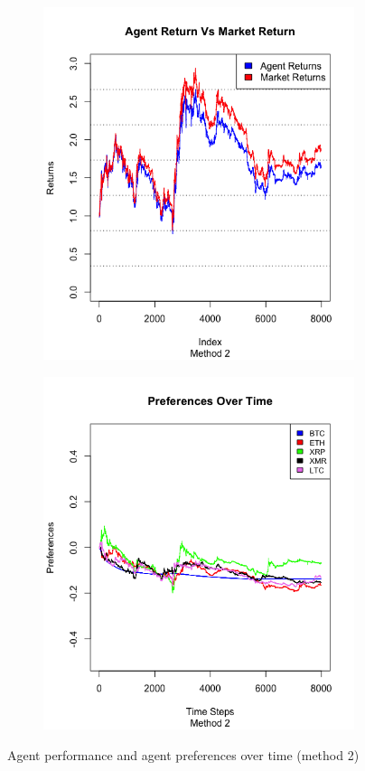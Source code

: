 \documentclass[a4paper,12pt]{article}
\begin{document}
\begin{figure}[h!]
  \centering
  \begin{subfigure}[b]{0.4\linewidth}
    \includegraphics[width=\linewidth]{figures/agt_vs_mkt2.png}
  \end{subfigure}
  \begin{subfigure}[b]{0.4\linewidth}
    \includegraphics[width=\linewidth]{figures/prefs2.png}
  \end{subfigure}
  \caption{Agent performance and agent preferences over time (method 2)}
  \label{fig:method2}
\end{figure}
\end{document}
